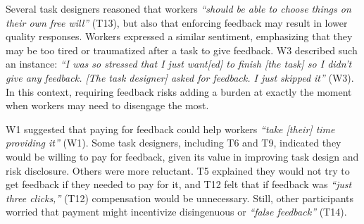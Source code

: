 Several task designers reasoned that workers \textit{``should be able to choose things on their own free will''} (T13), but also that enforcing feedback may result in lower quality responses. Workers expressed a similar sentiment, emphasizing that they may be too tired or traumatized after a task to give feedback. W3 described such an instance: \textit{``I was so stressed that I just want[ed] to finish [the task] so I didn't give any feedback. [The task designer] asked for feedback. I just skipped it''} (W3). In this context, requiring feedback risks adding a burden at exactly the moment when workers may need to disengage the most.

W1 suggested that paying for feedback could help workers \textit{``take [their] time providing it''} (W1). Some task designers, including T6 and T9, indicated they would be willing to pay for feedback, given its value in improving task design and risk disclosure. Others were more reluctant. T5 explained they would not try to get feedback if they needed to pay for it, and T12 felt that if feedback was \textit{``just three clicks,''} (T12) compensation would be unnecessary. Still, other participants worried that payment might incentivize disingenuous or \textit{``false feedback''} (T14). 


